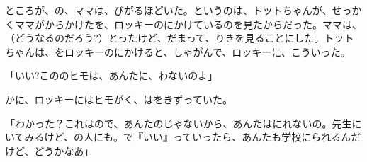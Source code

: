 ところが、の、ママは、びがるほどいた。というのは、トットちゃんが、せっかくママがからかけたを、ロッキーのにかけているのを見たからだった。ママは、（どうなるのだろう?）とったけど、だまって、りきを見ることにした。トットちゃんは、をロッキーのにかけると、しゃがんで、ロッキーに、こういった。

「いい?こののヒモは、あんたに、わないのよ」

かに、ロッキーにはヒモがく、はをきずっていた。

「わかった？これはので、あんたのじゃないから、あんたはにれないの。先生にいてみるけど、の人にも。で『いい』っていったら、あんたも学校にられるんだけど、どうかなあ」


